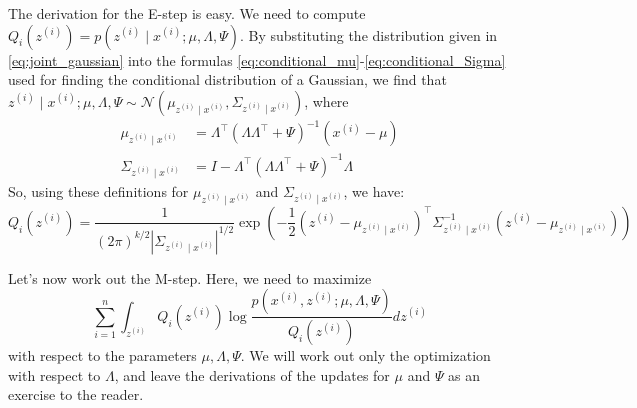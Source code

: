 \vspace{1cm}
The derivation for the E-step is easy. We need to compute $Q_i(z^{(i)}) = p(z^{(i)} \mid x^{(i)}; \mu ,\Lambda , \Psi)$.
By substituting the distribution given in \cref{eq:joint_gaussian}
into the formulas \ref{eq:conditional_mu}-\ref{eq:conditional_Sigma} used for finding the conditional distribution of a
Gaussian, we find that $z^{(i)} \mid x^{(i)}; \mu ,\Lambda , \Psi \sim \mathcal N (\mu_{z^{(i)} \mid x^{(i)}}, \Sigma_{z^{(i)}\mid x^{(i)}})$, where
\begin{align*}
    \mu_{z^{(i)} \mid x^{(i)}} &= \Lambda^\top (\Lambda \Lambda^\top + \Psi)^{-1} (x^{(i)} - \mu)\\
    \Sigma_{z^{(i)} \mid x^{(i)}} &= I - \Lambda^\top (\Lambda \Lambda^\top + \Psi)^{-1}\Lambda
\end{align*}
So, using these definitions for $\mu_{z^{(i)} \mid x^{(i)}}$ and $\Sigma_{z^{(i)} \mid x^{(i)}}$, we have:
\[
    Q_i(z^{(i)}) = \frac{1}{(2\pi)^{k/2}|\Sigma_{z^{(i)} \mid x^{(i)}}|^{1/2}}\exp\left(-\frac{1}{2} (z^{(i)} - \mu_{z^{(i)} \mid x^{(i)}})^\top\Sigma^{-1}_{z^{(i)} \mid x^{(i)}} (z^{(i)} - \mu_{z^{(i)} \mid x^{(i)}})\right)
\]

Let's now work out the M-step. Here, we need to maximize
\begin{equation}\label{eq:m_step_fa_max}
    \sum^n_{i=1}\int_{z^{(i)}} Q_i(z^{(i)})\log \frac{p(x^{(i)}, z^{(i)}; \mu ,\Lambda , \Psi)}{Q_i(z^{(i)})}dz^{(i)}
\end{equation}
with respect to the parameters $\mu ,\Lambda , \Psi$. We will work out only the optimization with respect to $\Lambda$, and leave the derivations of the updates for $\mu$ and $\Psi$
as an exercise to the reader.

